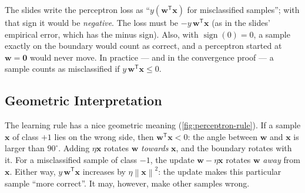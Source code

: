 \documentclass[11pt, oneside]{book}
\newcommand{\norm}[1]{\left\lVert #1 \right\rVert}
\newcommand{\T}{^{\mathsf{T}}}           %
\DeclareMathOperator{\sign}{sign}
\newcommand{\bx}{\bm{x}}        \newcommand{\by}{\bm{y}}
\newcommand{\bw}{\bm{w}}        \newcommand{\bW}{\bm{W}}
\let\originalsubsection\subsection
\renewcommand{\subsection}{\Needspace{6\baselineskip}\originalsubsection}
\begin{document}
\begin{notebox}[title={Sign conventions on the slides}]
The slides write the perceptron loss as ``$y(\bw\T\bx)$ for misclassified
samples''; with that sign it would be \emph{negative}. The loss must be
$-y\,\bw\T\bx$ (as in the slides' empirical error, which has the minus sign).
Also, with $\sign(0) = 0$, a sample exactly on the boundary would count as
correct, and a perceptron started at $\bw = \bm{0}$ would never move. In
practice --- and in the convergence proof --- a sample counts as
misclassified if $y\,\bw\T\bx \le 0$.
\end{notebox}

\subsection{Geometric Interpretation}

The learning rule has a nice geometric meaning (\cref{fig:perceptron-rule}).
If a sample $\bx$ of class $+1$ lies on the wrong side, then $\bw\T\bx < 0$:
the angle between $\bw$ and $\bx$ is larger than $90^\circ$. Adding $\eta\bx$
rotates $\bw$ \emph{towards} $\bx$, and the boundary rotates with it. For a
misclassified sample of class $-1$, the update $\bw - \eta\bx$ rotates $\bw$
\emph{away} from $\bx$. Either way, $y\,\bw\T\bx$ increases by
$\eta\norm{\bx}^2$: the update makes this particular sample ``more
correct''. It may, however, make other samples wrong.
\end{document}
